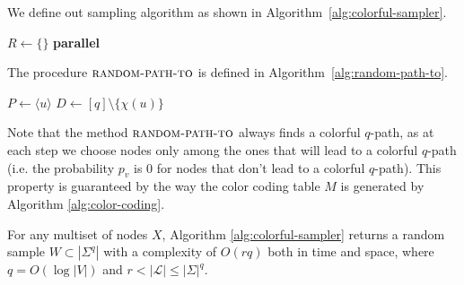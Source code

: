\clearpage

We define out sampling algorithm as shown in Algorithm~\ref{alg:colorful-sampler}.

\begin{algorithm}[h]
	\small
	\DontPrintSemicolon
	\BlankLine
	$R \gets \{\}$\;
	\BlankLine
	\textbf{parallel} 
	\BlankLine
	\BlankLine
	\caption{$\textsc{colorful-sampler}$}
	\label{alg:colorful-sampler}
\end{algorithm}

The procedure $\textsc{random-path-to}$ is defined in Algorithm~\ref{alg:random-path-to}.

\begin{algorithm}[h]
	\small
	\DontPrintSemicolon
	$P\gets \langle u \rangle$\;
	$D\gets [q] \setminus \{\chi(u)\}$\;
	\caption{$\textsc{random-path-to}$}
	\label{alg:random-path-to}
\end{algorithm}

Note that the method $\textsc{random-path-to}$ always finds a colorful $q$-path, as at each step we choose nodes only among the ones that will lead to a colorful $q$-path (i.e. the probability $p_{v}$ is $0$ for nodes that don't lead to a colorful $q$-path). This property is guaranteed by the way the color coding table $M$ is generated by Algorithm \ref{alg:color-coding}.

\begin{lemma}
	For any multiset of nodes $X$, 
	Algorithm \ref{alg:colorful-sampler} returns a random sample $W \subset |\Sigma^{q}|$ with a complexity of $O(rq)$ both in time and space, 
	where $q = O(\log |V|)$ and $r < |\mathcal{L}| \leq |\Sigma|^{q}$.
\end{lemma}

